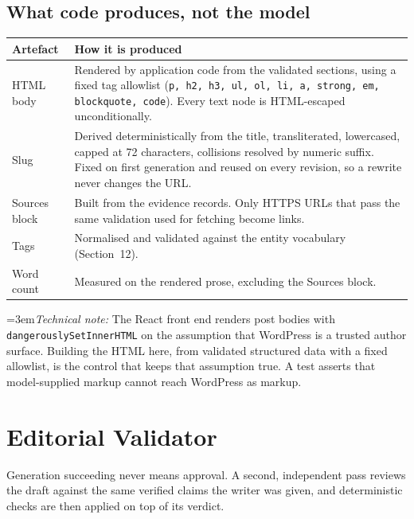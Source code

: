 \documentclass[11pt,a4paper]{article}
\newcommand{\brk}{\hyphenpenalty=0\exhyphenpenalty=0\relax}
\newcommand{\code}[1]{\texttt{\small\brk #1}}
\newcommand{\technote}[1]{\par\vspace{-0.25em}\begingroup\footnotesize\color{aitkGray}\sloppy\emergencystretch=3em\textit{Technical note:} #1\par\endgroup}
\begin{document}
\subsection{What code produces, not the model}

\begin{center}
\small
\begin{tabularx}{\textwidth}{@{}p{3.4cm} >{\RaggedRight}X@{}}
\toprule
\textbf{Artefact} & \textbf{How it is produced} \\
\midrule
HTML body & Rendered by application code from the validated sections, using a
  fixed tag allowlist (\code{p, h2, h3, ul, ol, li, a, strong, em, blockquote,
  code}). Every text node is HTML-escaped unconditionally. \\
Slug & Derived deterministically from the title, transliterated, lowercased,
  capped at 72 characters, collisions resolved by numeric suffix. Fixed on first
  generation and reused on every revision, so a rewrite never changes the URL. \\
Sources block & Built from the evidence records. Only HTTPS URLs that pass the
  same validation used for fetching become links. \\
Tags & Normalised and validated against the entity vocabulary (Section~12). \\
Word count & Measured on the rendered prose, excluding the Sources block. \\
\bottomrule
\end{tabularx}
\end{center}

\technote{The React front end renders post bodies with
\code{dangerouslySetInnerHTML} on the assumption that WordPress is a trusted
author surface. Building the HTML here, from validated structured data with a
fixed allowlist, is the control that keeps that assumption true. A test asserts
that model-supplied markup cannot reach WordPress as markup.}

\section{Editorial Validator}

Generation succeeding never means approval. A second, independent pass reviews
the draft against the same verified claims the writer was given, and
deterministic checks are then applied on top of its verdict.
\end{document}

